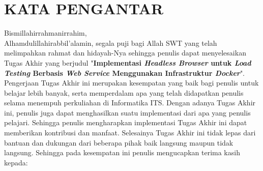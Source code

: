 \chapter{KATA PENGANTAR}
		Bismillahirrahmanirrahim, \\
		Alhamdulillahirabbil’alamin, segala puji bagi Allah SWT yang telah melimpahkan rahmat dan hidayah-Nya sehingga penulis dapat menyelesaikan Tugas Akhir yang berjudul "\textbf{Implementasi \textit{Headless Browser} untuk \textit{Load Testing} Berbasis \textit{Web Service} Menggunakan Infrastruktur \textit{Docker}}". Pengerjaan Tugas Akhir ini merupakan kesempatan yang baik bagi penulis untuk belajar lebih banyak, serta memperdalam apa yang telah didapatkan penulis selama menempuh perkuliahan di Informatika ITS. Dengan adanya Tugas Akhir ini, penulis juga dapat menghasilkan suatu implementasi dari apa yang penulis pelajari. Sehingga penulis mengharapkan implementasi Tugas Akhir ini dapat memberikan kontribusi dan manfaat. Selesainya Tugas Akhir ini tidak lepas dari bantuan dan dukungan dari beberapa pihak baik langsung maupun tidak langsung. Sehingga pada kesempatan ini penulis mengucapkan terima kasih kepada:
